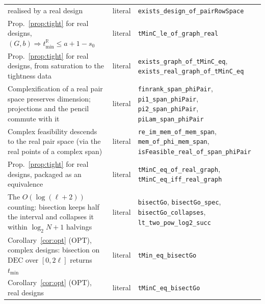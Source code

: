 ﻿\documentclass[journal]{IEEEtran}
\theoremstyle{plainn}
\theoremstyle{remark}
\begin{document}
\begin{table}[!t]
\begin{tabular}{@{}p{}>{\raggedright\arraybackslash}p{}>{\raggedright\arraybackslash}p{}@{}}
realised by a real design & literal &
\texttt{exists\_design\_of\_pairRowSpace} \\
Prop.~\ref{prop:tight} for real designs, $(G,b)\Rightarrow t_{\min}^{\mathbb R}\le a+1-s_0$ &
literal & \texttt{tMinC\_le\_of\_graph\_real} \\
Prop.~\ref{prop:tight} for real designs, from saturation to the tightness data & literal &
\texttt{exists\_graph\_of\_tMinC\_eq}, \texttt{exists\_real\_graph\_of\_tMinC\_eq} \\
Complexification of a real pair space preserves dimension; projections and the pencil commute
with it & literal &
\texttt{finrank\_span\_phiPair}, \texttt{pi1\_span\_phiPair}, \texttt{pi2\_span\_phiPair},
\texttt{piLam\_span\_phiPair} \\
Complex feasibility descends to the real pair space (via the real points of a complex span) &
literal &
\texttt{re\_im\_mem\_of\_mem\_span}, \texttt{mem\_of\_phi\_mem\_span},
\texttt{isFeasible\_real\_of\_span\_phiPair} \\
Prop.~\ref{prop:tight} for real designs, packaged as an equivalence & literal &
\texttt{tMinC\_eq\_of\_real\_graph}, \texttt{tMinC\_eq\_iff\_real\_graph} \\
The $O(\log(\ell+2))$ counting: bisection keeps half the interval and collapses it within
$\log_2 N+1$ halvings & literal &
\texttt{bisectGo}, \texttt{bisectGo\_spec}, \texttt{bisectGo\_collapses},
\texttt{lt\_two\_pow\_log2\_succ} \\
Corollary~\ref{cor:opt} ($\mathrm{OPT}$), complex designs: bisection on $\mathrm{DEC}$ over
$[0,2\ell]$ returns $t_{\min}$ & literal & \texttt{tMin\_eq\_bisectGo} \\
Corollary~\ref{cor:opt} ($\mathrm{OPT}$), real designs & literal &
\texttt{tMinC\_eq\_bisectGo} \\
\bottomrule
\end{tabular}
\end{table}
\end{document}
